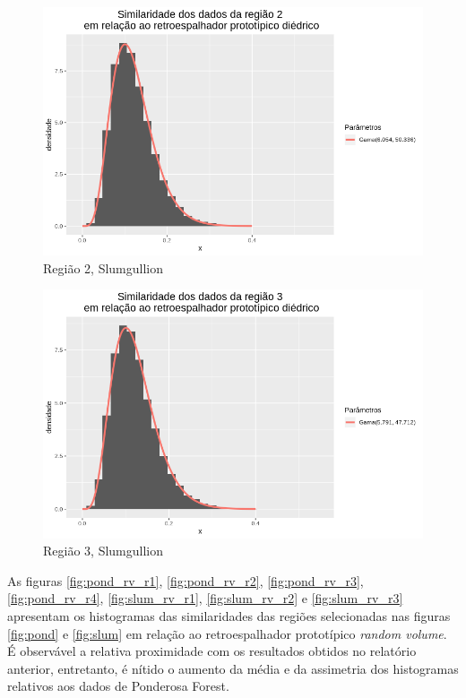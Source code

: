 \documentclass[12pt]{article}
\begin{document}
\begin{figure}[!h]
    \centering
    \vspace{0.1\linewidth}
    \includegraphics[width = \linewidth]{../../Images/Report_18_12_20/slum_di_region2.png}
    \caption{Região 2, Slumgullion}
    \label{fig:slum_di_r2}
\end{figure}

\begin{figure}[!h]
    \centering
    \vspace{0.1\linewidth}
    \includegraphics[width = \linewidth]{../../Images/Report_18_12_20/slum_di_region3.png}
    \caption{Região 3, Slumgullion}
    \label{fig:slum_di_r3}
\end{figure}

As figuras \ref{fig:pond_rv_r1}, \ref{fig:pond_rv_r2}, \ref{fig:pond_rv_r3}, \ref{fig:pond_rv_r4}, \ref{fig:slum_rv_r1}, \ref{fig:slum_rv_r2} e \ref{fig:slum_rv_r3} apresentam os histogramas das similaridades das regiões selecionadas nas figuras \ref{fig:pond} e \ref{fig:slum} em relação ao retroespalhador prototípico \textit{random volume}. É observável a relativa proximidade com os resultados obtidos no relatório anterior, entretanto, é nítido o aumento da média e da assimetria dos histogramas relativos aos dados de Ponderosa Forest.  
\end{document}
